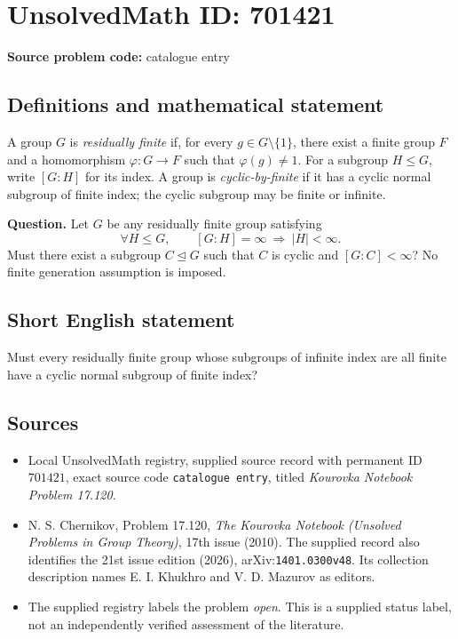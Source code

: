\documentclass[11pt]{article}
\begin{document}
\section*{UnsolvedMath ID: 701421}
\textbf{Source problem code:} catalogue entry
\subsection{Definitions and mathematical statement}
A group \(G\) is \emph{residually finite} if, for every \(g\in G\setminus\{1\}\), there exist a finite group \(F\) and a homomorphism \(\varphi:G\to F\) such that \(\varphi(g)\ne 1\). For a subgroup \(H\le G\), write \([G:H]\) for its index. A group is \emph{cyclic-by-finite} if it has a cyclic normal subgroup of finite index; the cyclic subgroup may be finite or infinite.

\textbf{Question.} Let \(G\) be any residually finite group satisfying
\[
\forall H\le G,\qquad [G:H]=\infty\ \Longrightarrow\ |H|<\infty.
\]
Must there exist a subgroup \(C\trianglelefteq G\) such that \(C\) is cyclic and \([G:C]<\infty\)? No finite generation assumption is imposed.
\subsection{Short English statement}
Must every residually finite group whose subgroups of infinite index are all finite have a cyclic normal subgroup of finite index?
\subsection{Sources}
\begin{itemize}
\item Local UnsolvedMath registry, supplied source record with permanent ID \(701421\), exact source code \texttt{catalogue entry}, titled \emph{Kourovka Notebook Problem 17.120}.
\item N. S. Chernikov, Problem 17.120, \emph{The Kourovka Notebook (Unsolved Problems in Group Theory)}, 17th issue (2010). The supplied record also identifies the 21st issue edition (2026), arXiv:\texttt{1401.0300v48}. Its collection description names E. I. Khukhro and V. D. Mazurov as editors.
\item The supplied registry labels the problem \emph{open}. This is a supplied status label, not an independently verified assessment of the literature.
\end{itemize}
\end{document}
